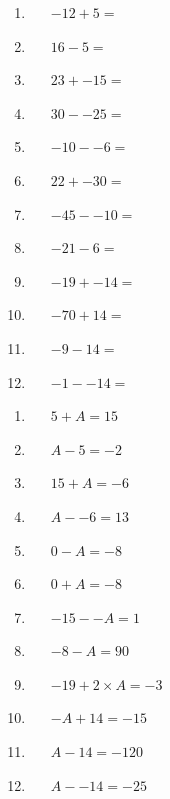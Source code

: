 \documentclass[a4paper,12pt]{article}
\begin{document}
\begin{tcolorbox}[colback=red!0!white, colframe=gray ,title=\subsubsection{General Questions.}\label{IntSix}]
	\begin{multicols}{3}
		\begin{enumerate}[label=\footnotesize \roman*)]
			\item~~~$-12+5=$
			\item~~~$ 16-5=$
			\item~~~$23+-15=$
			\item~~~$30--25=$
			\item~~~$-10--6=$
			\item~~~$22+-30=$
			\item~~~$-45--10=$
			\item~~~$-21-6=$
			\item~~~$-19+-14=$
			\item~~~$-70+14=$
			\item~~~$-9-14=$
			\item~~~$-1--14=$
		\end{enumerate}
	\end{multicols}
\end{tcolorbox}\vspace{0.75cm}
\begin{tcolorbox}[colback=red!0!white, colframe=gray ,title=\subsubsection{In these sums the letter ``A'' stands for a number. Find the correct value of A in each of the sums.}\label{IntSeven}]
	\begin{multicols}{3}
		\begin{enumerate}[label=\footnotesize \roman*)]
			\item~~~$5+A=15$
			\item~~~$ A-5=-2$
			\item~~~$15+A=-6$
			\item~~~$A--6=13$
			\item~~~$0-A=-8$
			\item~~~$0+A=-8$
			\item~~~$-15--A=1$
			\item~~~$-8-A=90$
			\item~~~$-19+2\times A=-3$
			\item~~~$-A+14=-15$
			\item~~~$A-14=-120$
			\item~~~$A--14=-25$
		\end{enumerate}
	\end{multicols}
\end{tcolorbox}\vspace{0.75cm}
\end{document}

